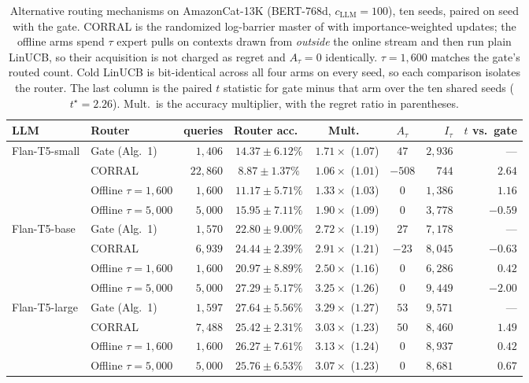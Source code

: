 \documentclass[anon]{alt2027} %
\begin{document}
\begin{table}[h]
\centering
\caption{Alternative routing mechanisms on AmazonCat-13K (BERT-768d,
$c_{\mathrm{LLM}}=100$), ten seeds, paired on seed with the gate. CORRAL is the randomized
log-barrier master of \citet{agarwal2017corralling} with importance-weighted
updates; the offline arms spend $\tau$ expert pulls on contexts drawn from
\emph{outside} the online stream and then run plain LinUCB, so their
acquisition is not charged as regret and $A_\tau=0$ identically.
$\tau=1{,}600$ matches the gate's routed count. Cold LinUCB is bit-identical
across all four arms on every seed, so each comparison isolates the router.
The last column is the paired $t$ statistic for gate minus that arm over the
ten shared seeds ($t^\star=2.26$). Mult.\ is the accuracy multiplier, with
the regret ratio in parentheses.}
\label{tab:baselines}
\small
\setlength{\tabcolsep}{4pt}
\begin{tabular}{@{}llrcccrr@{}}
\toprule
LLM & Router & queries & Router acc.\ & Mult.\ & $A_\tau$ & $I_\tau$ & $t$ vs.\ gate \\
\midrule
\multirow{4}{*}{Flan-T5-small}
 & Gate (Alg.\ 1)    & $1{,}406$  & $14.37\pm6.12\%$ & $1.71\times$ ($1.07$) & $47$   & $2{,}936$ & --- \\
 & CORRAL            & $22{,}860$ & $8.87\pm1.37\%$  & $1.06\times$ ($1.01$) & $-508$ & $744$     & $\mathbf{2.64}$ \\
 & Offline $\tau{=}1{,}600$ & $1{,}600$ & $11.17\pm5.71\%$ & $1.33\times$ ($1.03$) & $0$ & $1{,}386$ & $1.16$ \\
 & Offline $\tau{=}5{,}000$ & $5{,}000$ & $15.95\pm7.11\%$ & $1.90\times$ ($1.09$) & $0$ & $3{,}778$ & $-0.59$ \\
\midrule
\multirow{4}{*}{Flan-T5-base}
 & Gate (Alg.\ 1)    & $1{,}570$ & $22.80\pm9.00\%$ & $2.72\times$ ($1.19$) & $27$  & $7{,}178$ & --- \\
 & CORRAL            & $6{,}939$ & $24.44\pm2.39\%$ & $2.91\times$ ($1.21$) & $-23$ & $8{,}045$ & $-0.63$ \\
 & Offline $\tau{=}1{,}600$ & $1{,}600$ & $20.97\pm8.89\%$ & $2.50\times$ ($1.16$) & $0$ & $6{,}286$ & $0.42$ \\
 & Offline $\tau{=}5{,}000$ & $5{,}000$ & $27.29\pm5.17\%$ & $3.25\times$ ($1.26$) & $0$ & $9{,}449$ & $-2.00$ \\
\midrule
\multirow{4}{*}{Flan-T5-large}
 & Gate (Alg.\ 1)    & $1{,}597$ & $27.64\pm5.56\%$ & $3.29\times$ ($1.27$) & $53$ & $9{,}571$ & --- \\
 & CORRAL            & $7{,}488$ & $25.42\pm2.31\%$ & $3.03\times$ ($1.23$) & $50$ & $8{,}460$ & $1.49$ \\
 & Offline $\tau{=}1{,}600$ & $1{,}600$ & $26.27\pm7.61\%$ & $3.13\times$ ($1.24$) & $0$ & $8{,}937$ & $0.42$ \\
 & Offline $\tau{=}5{,}000$ & $5{,}000$ & $25.76\pm6.53\%$ & $3.07\times$ ($1.23$) & $0$ & $8{,}681$ & $0.67$ \\
\bottomrule
\end{tabular}
\end{table}
\end{document}

